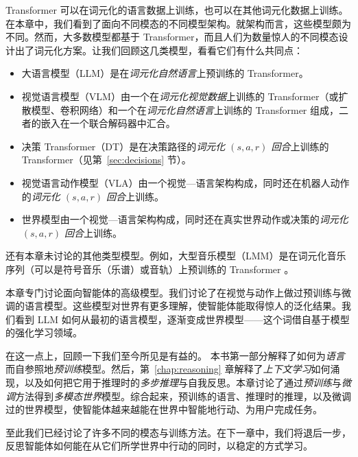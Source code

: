 Transformer 可以在词元化的语言数据上训练，也可以在其他词元化数据上训练。在本章中，我们看到了面向不同模态的不同模型架构。就架构而言，这些模型颇为不同。然而，大多数模型都基于 Transformer，而且人们为数量惊人的不同模态设计出了词元化方案。让我们回顾这几类模型，看看它们有什么共同点：
\begin{itemize}
    \item  大语言模型（LLM）是在{\em 词元化自然语言}上预训练的 Transformer。
    \item 视觉语言模型（VLM）由一个在{\em 词元化视觉数据}上训练的 Transformer（或扩散模型、卷积网络）和一个在{\em 词元化自然语言}上训练的 Transformer 组成，二者的嵌入在一个联合解码器中汇合。
    \item 决策 Transformer（DT）是在决策路径的{\em 词元化 $(s,a,r)$ 回合}上训练的 Transformer（见第~\ref{sec:decisions} 节）。
    \item 视觉语言动作模型（VLA）由一个视觉—语言架构构成，同时还在机器人动作的{\em 词元化 $(s,a,r)$ 回合}上训练。
    \item 世界模型由一个视觉—语言架构构成，同时还在真实世界动作或决策的{\em 词元化 $(s,a,r)$ 回合}上训练。
\end{itemize}
还有本章未讨论的其他类型模型。例如，大型音乐模型（LMM）是在词元化音乐序列（可以是符号音乐（乐谱）或音轨）上预训练的 Transformer \citep{yuan2025yue}。

本章专门讨论面向智能体的高级模型。我们讨论了在视觉与动作上做过预训练与微调的语言模型。这些模型对世界有更多理解，使智能体能取得惊人的泛化结果。我们看到 LLM 如何从最初的语言模型，逐渐变成世界模型——这个词借自基于模型的强化学习领域。

在这一点上，回顾一下我们至今所见是有益的。
本书第一部分解释了如何为{\em 语言}而自参照地{\em 预训练}模型。然后，第~\ref{chap:reasoning} 章解释了{\em 上下文学习}如何涌现，以及如何把它用于推理时的{\em 多步推理}与自我反思。本章讨论了通过{\em 预训练}与{\em 微调}方法得到{\em 多模态世界}模型。综合起来，预训练的语言、推理时的推理，以及微调过的世界模型，使智能体越来越能在世界中智能地行动、为用户完成任务。%

至此我们已经讨论了许多不同的模态与训练方法。在下一章中，我们将退后一步，反思智能体如何能在从它们所学世界中行动的同时，以稳定的方式学习。






